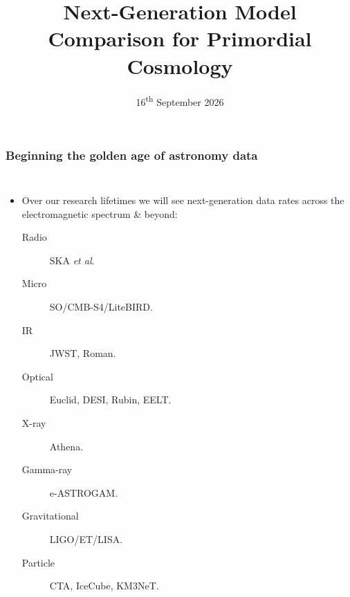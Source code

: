 \documentclass[aspectratio=169]{beamer}
\title{Next-Generation Model Comparison for Primordial Cosmology}
\date{16\textsuperscript{th} September 2026}
\begin{document}
\begin{frame}
    \titlepage
\end{frame}

\begin{frame}
    \frametitle{Beginning the golden age of astronomy data}
    \begin{columns}
        \begin{itemize}
            \item Over our research lifetimes we will see next-generation data rates across the electromagnetic spectrum \& beyond:
                \begin{description}
                    \item[Radio] SKA \textit{et al}.
                    \item[Micro] SO/CMB-S4/LiteBIRD.
                    \item[IR] JWST, Roman.
                    \item[Optical] Euclid, DESI, Rubin, EELT.
                    \item[X-ray] Athena.
                    \item[Gamma-ray] e-ASTROGAM.
                    \item[Gravitational] LIGO/ET/LISA.
                    \item[Particle] CTA, IceCube, KM3NeT.
                \end{description}
        \end{itemize}


\end{columns}
\end{frame}
\end{document}
